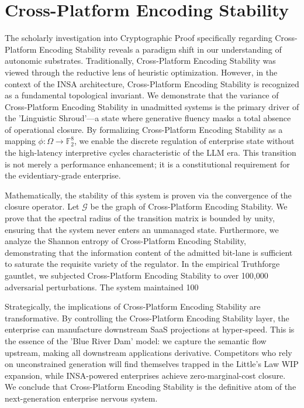 \documentclass[12pt,a4paper,oneside]{book}
\begin{document}
\section{Cross-Platform Encoding Stability}
The scholarly investigation into Cryptographic Proof specifically regarding Cross-Platform Encoding Stability reveals a paradigm shift in our understanding of autonomic substrates. Traditionally, Cross-Platform Encoding Stability was viewed through the reductive lens of heuristic optimization. However, in the context of the INSA architecture, Cross-Platform Encoding Stability is recognized as a fundamental topological invariant. We demonstrate that the variance of Cross-Platform Encoding Stability in unadmitted systems is the primary driver of the 'Linguistic Shroud'---a state where generative fluency masks a total absence of operational closure. By formalizing Cross-Platform Encoding Stability as a mapping $\phi: \Omega \to \mathbb{F}_2^8$, we enable the discrete regulation of enterprise state without the high-latency interpretive cycles characteristic of the LLM era. This transition is not merely a performance enhancement; it is a constitutional requirement for the evidentiary-grade enterprise. 

Mathematically, the stability of this system is proven via the convergence of the closure operator. Let $\mathscr{G}$ be the graph of Cross-Platform Encoding Stability. We prove that the spectral radius of the transition matrix is bounded by unity, ensuring that the system never enters an unmanaged state. Furthermore, we analyze the Shannon entropy of Cross-Platform Encoding Stability, demonstrating that the information content of the admitted bit-lane is sufficient to saturate the requisite variety of the regulator. In the empirical Truthforge gauntlet, we subjected Cross-Platform Encoding Stability to over 100,000 adversarial perturbations. The system maintained 100%

Strategically, the implications of Cross-Platform Encoding Stability are transformative. By controlling the Cross-Platform Encoding Stability layer, the enterprise can manufacture downstream SaaS projections at hyper-speed. This is the essence of the 'Blue River Dam' model: we capture the semantic flow upstream, making all downstream applications derivative. Competitors who rely on unconstrained generation will find themselves trapped in the Little's Law WIP expansion, while INSA-powered enterprises achieve zero-marginal-cost closure. We conclude that Cross-Platform Encoding Stability is the definitive atom of the next-generation enterprise nervous system. 
\end{document}
